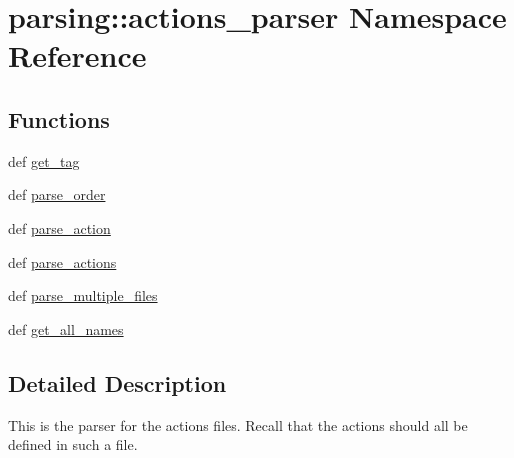 \hypertarget{namespaceparsing_1_1actions__parser}{\section{parsing\-:\-:actions\-\_\-parser \-Namespace \-Reference}
\label{namespaceparsing_1_1actions__parser}
}
\subsection*{\-Functions}
\begin{DoxyCompactItemize}
\item 
def \hyperlink{namespaceparsing_1_1actions__parser_ae4a261323d279bcdd1e7c797a56fd37a}{get\-\_\-tag}
\item 
def \hyperlink{namespaceparsing_1_1actions__parser_a32ae0cad2fc0c95abf9b8203c535f0ff}{parse\-\_\-order}
\item 
def \hyperlink{namespaceparsing_1_1actions__parser_afbc5f28ba3d650c4636cbdf9a7351fcb}{parse\-\_\-action}
\item 
def \hyperlink{namespaceparsing_1_1actions__parser_a8456330c2da34d2c7ad6617f6c8fd138}{parse\-\_\-actions}
\item 
def \hyperlink{namespaceparsing_1_1actions__parser_a44aace359bb7f061909be51273e13b17}{parse\-\_\-multiple\-\_\-files}
\item 
def \hyperlink{namespaceparsing_1_1actions__parser_a2718f249a2d5072647710a0f357ac577}{get\-\_\-all\-\_\-names}
\end{DoxyCompactItemize}


\subsection{\-Detailed \-Description}
\begin{DoxyVerb}
This is the parser for the actions files.
Recall that the actions should all be defined in such a file.
\end{DoxyVerb}
 

